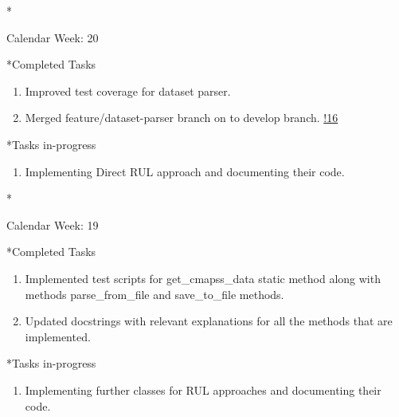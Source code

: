 \documentclass[11pt,a4paper]{article}
\begin{document}
\begin{section}*{Calendar Week: 20  \hfill \date{21 May, 2021}}
 \begin{refsection}
     \begin{subsection}*{Completed Tasks}
         \begin{enumerate}
             \item Improved test coverage for dataset parser.
             \item Merged feature/dataset-parser branch on to develop branch. \href{https://git.cs.uni-paderborn.de/machine-learning-for-predictive-maintenance/code/-/merge_requests/16}{!16}
         \end{enumerate}
     \end{subsection}
     \begin{subsection}*{Tasks in-progress}
         \begin{enumerate}
             \item Implementing Direct RUL approach and documenting their code.
         \end{enumerate}
     \end{subsection}
 \end{refsection}
\end{section}
\newpage
\begin{section}*{Calendar Week: 19  \hfill \date{14 May, 2021}}
 \begin{refsection}
     \begin{subsection}*{Completed Tasks}
         \begin{enumerate}
             \item Implemented test scripts for get\_cmapss\_data static method along with methods parse\_from\_file and save\_to\_file methods.
             \item Updated docstrings with relevant explanations for all the methods that are implemented.
         \end{enumerate}
     \end{subsection}
     \begin{subsection}*{Tasks in-progress}
         \begin{enumerate}
             \item Implementing further classes for RUL approaches and documenting their code.
         \end{enumerate}
     \end{subsection}
 \end{refsection}
\end{section}
\end{document}

